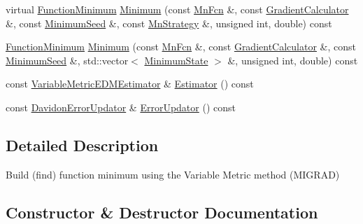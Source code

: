 \begin{DoxyCompactItemize}
\item 
virtual \mbox{\hyperlink{classROOT_1_1Minuit2_1_1FunctionMinimum}{Function\+Minimum}} \mbox{\hyperlink{classROOT_1_1Minuit2_1_1VariableMetricBuilder_af39ef2e38ec2bf3d94fa78fe0ed9a64a}{Minimum}} (const \mbox{\hyperlink{classROOT_1_1Minuit2_1_1MnFcn}{Mn\+Fcn}} \&, const \mbox{\hyperlink{classROOT_1_1Minuit2_1_1GradientCalculator}{Gradient\+Calculator}} \&, const \mbox{\hyperlink{classROOT_1_1Minuit2_1_1MinimumSeed}{Minimum\+Seed}} \&, const \mbox{\hyperlink{classROOT_1_1Minuit2_1_1MnStrategy}{Mn\+Strategy}} \&, unsigned int, double) const
\item 
\mbox{\hyperlink{classROOT_1_1Minuit2_1_1FunctionMinimum}{Function\+Minimum}} \mbox{\hyperlink{classROOT_1_1Minuit2_1_1VariableMetricBuilder_a6214271e1802f110e94725295f3900fc}{Minimum}} (const \mbox{\hyperlink{classROOT_1_1Minuit2_1_1MnFcn}{Mn\+Fcn}} \&, const \mbox{\hyperlink{classROOT_1_1Minuit2_1_1GradientCalculator}{Gradient\+Calculator}} \&, const \mbox{\hyperlink{classROOT_1_1Minuit2_1_1MinimumSeed}{Minimum\+Seed}} \&, std\+::vector$<$ \mbox{\hyperlink{classROOT_1_1Minuit2_1_1MinimumState}{Minimum\+State}} $>$ \&, unsigned int, double) const
\item 
const \mbox{\hyperlink{classROOT_1_1Minuit2_1_1VariableMetricEDMEstimator}{Variable\+Metric\+E\+D\+M\+Estimator}} \& \mbox{\hyperlink{classROOT_1_1Minuit2_1_1VariableMetricBuilder_a2440f7838cbff6043ee58272890aa210}{Estimator}} () const
\item 
const \mbox{\hyperlink{classROOT_1_1Minuit2_1_1DavidonErrorUpdator}{Davidon\+Error\+Updator}} \& \mbox{\hyperlink{classROOT_1_1Minuit2_1_1VariableMetricBuilder_aa10879d53daedb3e742f35d3c3f3b3d6}{Error\+Updator}} () const
\end{DoxyCompactItemize}


\subsection{Detailed Description}
Build (find) function minimum using the Variable Metric method (M\+I\+G\+R\+AD) 

\subsection{Constructor \& Destructor Documentation}
\mbox{\label{classROOT_1_1Minuit2_1_1VariableMetricBuilder_a3fa1bd08281c31511236e97c865f893f}} 
